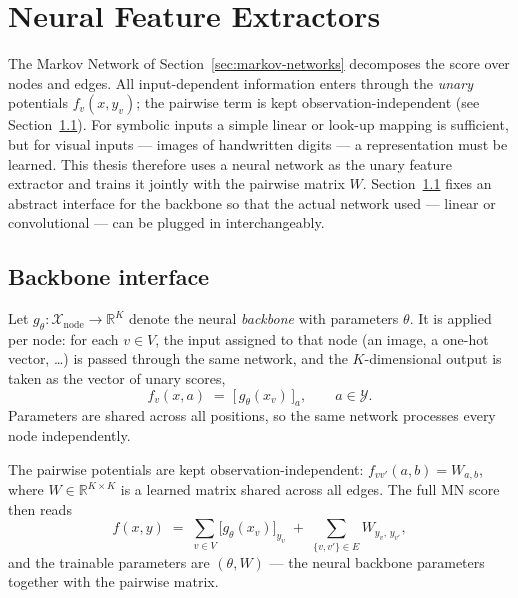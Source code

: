 
\section{Neural Feature Extractors}
\label{sec:nn-features}

The Markov Network of Section~\ref{sec:markov-networks} decomposes the
score over nodes and edges. All input-dependent information enters
through the \emph{unary} potentials $f_{v}(x, y_{v})$; the pairwise
term is kept observation-independent (see
Section~\ref{subsec:backbone-interface}). For symbolic inputs
a simple linear or look-up mapping is sufficient, but for visual
inputs --- images of handwritten digits --- a representation must be
learned. This thesis therefore uses a neural network as the unary
feature extractor and trains it jointly with the pairwise
matrix $W$.
Section~\ref{subsec:backbone-interface} fixes an abstract
interface for the backbone so that the actual network used ---
linear or convolutional --- can be plugged in interchangeably.

\subsection{Backbone interface}
\label{subsec:backbone-interface}

Let $g_{\theta} \colon \mathcal{X}_{\mathrm{node}} \to \mathbb{R}^{K}$
denote the neural \emph{backbone} with parameters $\theta$. It is
applied per node: for each $v \in V$, the input assigned to that node
(an image, a one-hot vector, \ldots) is passed through the same
network, and the $K$-dimensional output is taken as the vector of
unary scores,
\begin{equation}
    f_{v}(x, a) \;=\; \bigl[\, g_{\theta}(x_{v}) \,\bigr]_{a},
    \qquad a \in \mathcal{Y}.
    \label{eq:nn-unary}
\end{equation}
Parameters are shared across all positions, so the same network
processes every node independently.

The pairwise potentials are kept observation-independent: $f_{vv'}(a, b) = W_{a, b}$, where $W \in \mathbb{R}^{K \times K}$ is a
learned matrix shared across all edges. The full MN score then reads
\begin{equation}
    f(x, y) \;=\; \sum_{v \in V}
    \bigl[ g_{\theta}(x_{v}) \bigr]_{y_{v}}
    \;+\; \sum_{\{v, v'\} \in E} W_{y_{v},\, y_{v'}},
    \label{eq:nn-mn-score}
\end{equation}
and the trainable parameters are $(\theta, W)$ --- the neural
backbone parameters together with the pairwise matrix.

